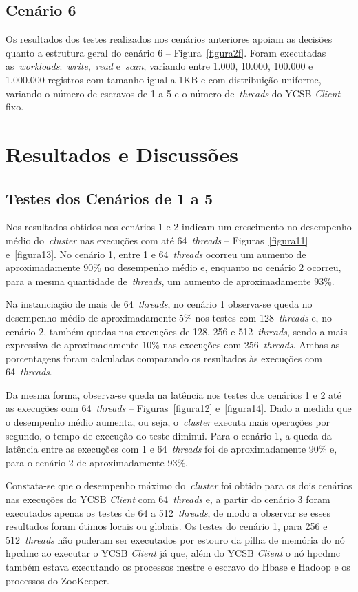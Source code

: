 \documentclass[12pt]{article}
\begin{document}
\subsection{Cenário 6}
Os resultados dos testes realizados nos cenários anteriores apoiam as decisões quanto a estrutura geral do cenário 6 -- Figura~\ref{figura2f}. Foram executadas as~\emph{workloads}:~\emph{write},~\emph{read} e~\emph{scan}, variando entre 1.000, 10.000, 100.000 e 1.000.000 registros com tamanho igual a 1KB e com distribuição uniforme, variando o número de escravos de 1 a 5 e o número de~\emph{threads} do YCSB \textit{Client} fixo.

\section{Resultados e Discussões}
\label{sec:resultados}

\subsection{Testes dos Cenários de 1 a 5}

Nos resultados obtidos nos cenários 1 e 2 indicam um crescimento no desempenho médio do~\emph{cluster} nas execuções com até 64~\emph{threads} -- Figuras~\ref{figura11} e~\ref{figura13}. No cenário 1, entre 1 e 64~\emph{threads} ocorreu um aumento de aproximadamente 90\% no desempenho médio e, enquanto no cenário 2 ocorreu, para a mesma quantidade de~\emph{threads}, um aumento de aproximadamente 93\%.

Na instanciação de mais de 64~\emph{threads}, no cenário 1 observa-se queda no desempenho médio de aproximadamente 5\% nos testes com 128~\emph{threads} e, no cenário 2, também quedas nas execuções de 128, 256 e 512~\emph{threads}, sendo a mais expressiva de aproximadamente 10\% nas execuções com 256~\emph{threads}. Ambas as porcentagens foram calculadas comparando os resultados às execuções com 64~\emph{threads}.

Da mesma forma, observa-se queda na latência nos testes dos cenários 1 e 2 até as execuções com 64~\emph{threads} -- Figuras~\ref{figura12} e~\ref{figura14}. Dado a medida que o desempenho médio aumenta, ou seja, o~\emph{cluster} executa mais operações por segundo, o tempo de execução do teste diminui. Para o cenário 1, a queda da latência entre as execuções com 1 e 64~\emph{threads} foi de aproximadamente 90\% e, para o cenário 2 de aproximadamente 93\%.

Constata-se que o desempenho máximo do~\emph{cluster}  foi obtido para os dois cenários nas execuções do YCSB \textit{Client} com 64~\emph{threads} e, a partir do cenário 3 foram executados apenas os testes de 64 a 512~\emph{threads}, de modo a observar se esses resultados foram ótimos locais ou globais. Os testes do cenário 1, para 256 e 512~\emph{threads} não puderam ser executados por estouro da pilha de memória do nó hpcdmc ao executar o YCSB \textit{Client} já que, além do YCSB \textit{Client} o nó hpcdmc também estava executando os processos mestre e escravo do Hbase e Hadoop e os processos do ZooKeeper.
\end{document}
